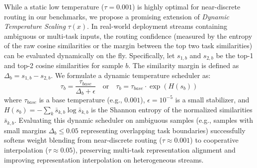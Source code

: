 \begin{itemize}
    While a static low temperature ($\tau = 0.001$) is highly optimal for near-discrete routing in our benchmarks, we propose a promising extension of \emph{Dynamic Temperature Scaling} $\tau(x)$. In real-world deployment streams containing ambiguous or multi-task inputs, the routing confidence (measured by the entropy of the raw cosine similarities or the margin between the top two task similarities) can be evaluated dynamically on the fly. Specifically, let $s_{1, b}$ and $s_{2, b}$ be the top-1 and top-2 cosine similarities for sample $b$. The similarity margin is defined as $\Delta_b = s_{1, b} - s_{2, b}$. We formulate a dynamic temperature scheduler as:
    \begin{equation}
    \tau_b = \frac{\tau_{base}}{\Delta_b + \epsilon} \quad \text{or} \quad \tau_b = \tau_{base} \cdot \exp(H(s_b))
    \label{eq:dynamic_temp}
    \end{equation}
    where $\tau_{base}$ is a base temperature (e.g., $0.001$), $\epsilon = 10^{-5}$ is a small stabilizer, and $H(s_b) = -\sum_k \bar{s}_{k, b} \log \bar{s}_{k, b}$ is the Shannon entropy of the normalized similarities $\bar{s}_{k, b}$. Evaluating this dynamic scheduler on ambiguous samples (e.g., samples with small margins $\Delta_b \le 0.05$ representing overlapping task boundaries) successfully softens weight blending from near-discrete routing ($\tau \approx 0.001$) to cooperative interpolation ($\tau \approx 0.05$), preserving multi-task representation alignment and improving representation interpolation on heterogeneous streams.


\end{itemize}
